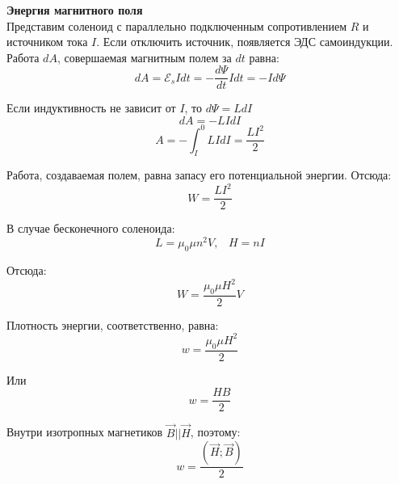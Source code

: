 \documentclass{article}
\begin{document}
	
	\textbf{Энергия магнитного поля}\\

	Представим соленоид с параллельно подключенным сопротивлением $R$ и источником тока $I$. Если отключить источник, появляется ЭДС самоиндукции. Работа $dA$, совершаемая магнитным полем за $dt$ равна:
	\begin{equation}
		dA = \mathcal{E}_s I dt = -\frac{d\Psi}{dt}Idt = -Id\Psi
	\end{equation}

	Если индуктивность не зависит от $I$, то $d\Psi=LdI$ 
	\begin{equation}
		dA = -LIdI
	\end{equation}
	\begin{equation}
		A = -\int_I^0 LI dI = \frac{LI^2}{2}
	\end{equation}

	Работа, создаваемая полем, равна запасу его потенциальной энергии. Отсюда:
	\begin{equation}
		W = \frac{LI^2}{2}
	\end{equation}

	В случае бесконечного соленоида:
	\begin{equation}
		L = \mu_0\mu n^2 V,\;\;\;H=nI
	\end{equation}

	Отсюда:
	\begin{equation}
		W = \frac{\mu_0\mu H^2}{2}V
	\end{equation}

	Плотность энергии, соответственно, равна:
	\begin{equation}
		w = \frac{\mu_0\mu H^2}{2}
	\end{equation}

	Или
	\begin{equation}
		w = \frac{HB}{2}
	\end{equation}

	Внутри изотропных магнетиков $\vec B || \vec H$, поэтому:
	\begin{equation}
		w = \frac{(\vec H;\vec B)}{2}
	\end{equation}
\end{document}
